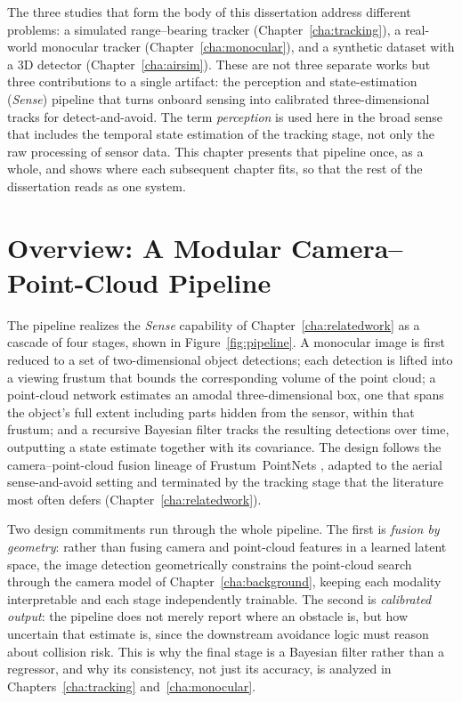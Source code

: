 
The three studies that form the body of this dissertation address different
problems: a simulated range--bearing tracker (Chapter~\ref{cha:tracking}), a
real-world monocular tracker (Chapter~\ref{cha:monocular}), and a synthetic
dataset with a 3D detector (Chapter~\ref{cha:airsim}). These are not three
separate works but three contributions to a single artifact: the perception and
state-estimation (\emph{Sense}) pipeline that turns onboard sensing into
calibrated three-dimensional tracks for detect-and-avoid. The term
\emph{perception} is used here in the broad sense that includes the temporal
state estimation of the tracking stage, not only the raw processing of sensor
data. This chapter presents that pipeline once, as a whole, and shows where each
subsequent chapter fits, so that the rest of the dissertation reads as one
system.

\section{Overview: A Modular Camera--Point-Cloud Pipeline}
\label{sec:pipeline-overview}

The pipeline realizes the \emph{Sense} capability of
Chapter~\ref{cha:relatedwork} as a cascade of four stages, shown in
Figure~\ref{fig:pipeline}. A monocular image is first reduced to a set of
two-dimensional object detections; each detection is lifted into a viewing
frustum that bounds the corresponding volume of the point cloud; a point-cloud
network estimates an amodal three-dimensional box, one that spans the object's
full extent including parts hidden from the sensor, within that frustum; and a
recursive Bayesian filter tracks the resulting detections over time, outputting a
state estimate together with its covariance. The design follows the
camera--point-cloud fusion lineage of Frustum~PointNets \cite{qi2018frustum},
adapted to the aerial sense-and-avoid setting and terminated by the tracking stage
that the literature most often defers (Chapter~\ref{cha:relatedwork}).

Two design commitments run through the whole pipeline. The first is
\emph{fusion by geometry}: rather than fusing camera and point-cloud features in a
learned latent space, the image detection geometrically constrains the
point-cloud search through the camera model of Chapter~\ref{cha:background},
keeping each modality interpretable and each stage independently trainable. The
second is \emph{calibrated output}: the pipeline does not merely report where an
obstacle is, but how uncertain that estimate is, since the downstream avoidance
logic must reason about collision risk. This is why the final
stage is a Bayesian filter rather than a regressor, and why its consistency, not
just its accuracy, is analyzed in Chapters~\ref{cha:tracking}
and~\ref{cha:monocular}.

